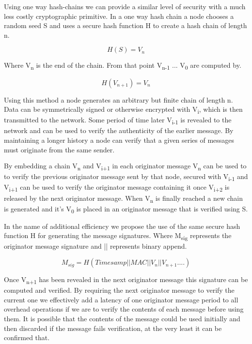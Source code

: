 \documentclass[11pt]{article}
\begin{document}
               Using one way hash-chains we can provide a similar level of security with a much less costly cryptographic primitive. In a one way hash chain a node chooses a random seed S and uses a secure hash function H to create a hash chain of length n. 
               
               \[H(S) = V_n\] 
               
               Where V\textsubscript{n} is the end of the chain. From that point V\textsubscript{n-1} ... V\textsubscript{0} are computed by.
               
               \[H(V_{n+1}) = V_n\] 
               
               Using this method a node generates an arbitrary but finite chain of length n. Data can be symmetrically signed or otherwise encrypted with V\textsubscript{i}, which is then transmitted to the network. Some period of time later V\textsubscript{i-1} is revealed to the network and can be used to verify the authenticity of the earlier message. By maintaining a longer history a node can verify that a given series of messages must originate from the same sender.
               
               By embedding a chain V\textsubscript{n} and V\textsubscript{i+1} in each originator message V\textsubscript{n} can be used to to verify the previous originator message sent by that node, secured with V\textsubscript{i-1} and V\textsubscript{i+1} can be used to verify the originator message containing it once V\textsubscript{i+2} is released by the next originator message. When V\textsubscript{n} is finally reached a new chain is generated and it's V\textsubscript{0} is placed in an originator message that is verified using S.      
               
               
               In the name of additional efficiency we propose the use of the same secure hash function H for generating the message signatures. Where M\textsubscript{sig} represents the originator message signature and || represents binary append.
               
               \[M_{sig} = H(Timesamp||MAC||V_n||V_{n+1}....)\]
               
               Once V\textsubscript{n+1} has been revealed in the next originator message this signature can be computed and verified. By requiring the next originator message to verify the current one we effectively add a latency of one originator message period to all overhead operations if we are to verify the contents of each message before using them. It is possible that the contents of the message could be used initially and then discarded if the message fails verification, at the very least it can be confirmed that.
                     
\end{document}
